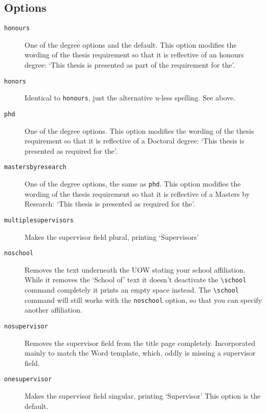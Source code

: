 \documentclass[12pt,oneside]{article}
\newcommand{\oporcom}[1]{\texttt{\color{RoyalBlue}#1}} %
\begin{document}
\subsection*{Options}
\begin{description}
    \item[\oporcom{honours}]
    One of the degree options and the default. This option modifies the wording of the thesis requirement so that it is reflective of an honours degree: `This thesis is presented as part of the requirement for the'.
    
    \item[\oporcom{honors}]
    Identical to \oporcom{honours}, just the alternative u-less spelling. See above.
    
    \item[\oporcom{phd}]
    One of the degree options. This option modifies the wording of the thesis requirement so that it is reflective of a Doctoral degree: `This thesis is presented as required for the'.
    
    \item[\oporcom{mastersbyresearch}]
    One of the degree options, the same as \oporcom{phd}. This option modifies the wording of the thesis requirement so that it is reflective of a Masters by Research: `This thesis is presented as required for the'.
    
    \item[\oporcom{multiplesupervisors}]
    Makes the supervisor field plural, printing `Supervisors'
    
    \item[\oporcom{noschool}]
    Removes the text underneath the UOW stating your school affiliation. While it removes the `School of' text it doesn't deactivate the \oporcom{\textbackslash{}school} command completely it prints an empty space instead. The \oporcom{\textbackslash{}school} command will still works with the \oporcom{noschool} option, so that you can specify another affiliation.
    
    \item[\oporcom{nosupervisor}]
    Removes the supervisor field from the title page completely. Incorporated mainly to match the Word template, which, oddly is missing a supervisor field.
    
    \item[\oporcom{onesupervisor}]
    Makes the supervisor field singular, printing `Supervisor' This option is the default.
\end{description}
\end{document}
